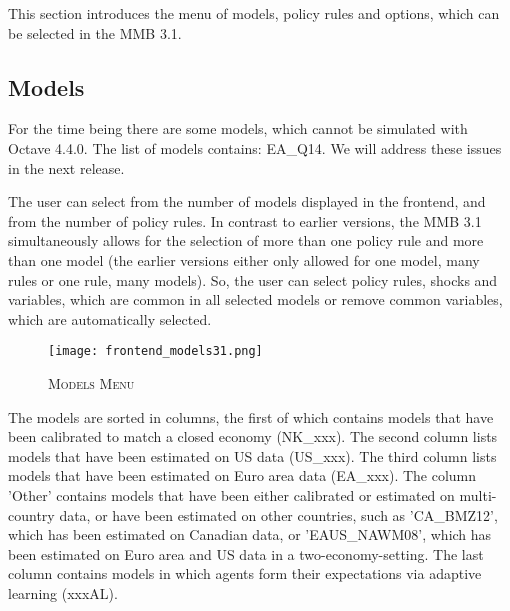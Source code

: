 This section introduces the menu of models, policy rules and options, which can be selected in the MMB 3.1.
\subsection*{Models}
For the time being there are some models, which cannot be simulated with Octave 4.4.0. The list of models contains: EA\_Q14. We will address these issues in the next release.

The user can select from the number of models displayed in the frontend, and from the number of policy rules. In contrast to earlier versions, the MMB 3.1 simultaneously allows for the selection of more than one policy rule and more than one model (the earlier versions either only allowed for one model, many rules or one rule, many models).  So, the user can select policy rules, shocks and variables, which are common in all selected models or remove common variables, which are automatically selected.


\begin{figure}[H]
	\centering
	\caption{\textsc{Models Menu}}
	\vspace{0.2cm}
	\texttt{[image: frontend\_models31.png]}\\
	\label{img:Models}
\end{figure}

The models are sorted in columns, the first of which contains models that have been calibrated to match a closed economy (NK\_xxx). The second column lists models that have been estimated on US data (US\_xxx). The third column lists models that have been estimated on Euro area data (EA\_xxx). The column 'Other' contains models that have been either calibrated or estimated on multi-country data, or have been estimated on other countries, such as 'CA\_BMZ12', which has been estimated on Canadian data, or 'EAUS\_NAWM08', which has been estimated on Euro area and US data in a two-economy-setting. The last column contains models in which agents form their expectations via adaptive learning (xxxAL). 


